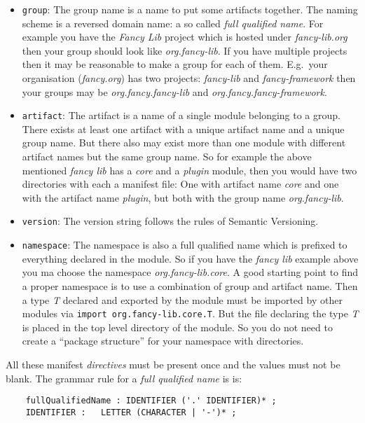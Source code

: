 \documentclass[a4paper,12pt]{report}
\begin{document}
\begin{itemize}
    \item \texttt{group}: The group name is a name to put some artifacts together. The naming scheme is a reversed domain name: a so called \textit{full qualified name}. For example you have the \textit{Fancy Lib} project which is hosted under \textit{fancy-lib.org} then your group should look like \textit{org.fancy-lib}. If you have multiple projects then it may be reasonable to make a group for each of them. E.g.\ your organisation (\textit{fancy.org}) has two projects: \textit{fancy-lib} and \textit{fancy-framework} then your groups may be \textit{org.fancy.fancy-lib} and \textit{org.fancy.fancy-framework}.
    \item \texttt{artifact}: The artifact is a name of a single module belonging to a group. There exists at least one artifact with a unique artifact name and a unique group name. But there also may exist more than one module with different artifact names but the same group name. So for example the above mentioned \textit{fancy lib} has a \textit{core} and a \textit{plugin} module, then you would have two directories with each a manifest file: One with artifact name \textit{core} and one with the artifact name \textit{plugin}, but both with the group name \textit{org.fancy-lib}.
    \item \texttt{version}: The version string follows the rules of Semantic Versioning\cite{semver}.
    \item \texttt{namespace}: The namespace is also a full qualified name which is prefixed to everything declared in the module. So if you have the \textit{fancy lib} example above you ma choose the namespace \textit{org.fancy-lib.core}. A good starting point to find a proper namespace is to use a combination of group and artifact name. Then a type \textit{T} declared and exported by the module must be imported by other modules via \texttt{import org.fancy-lib.core.T}. But the file declaring the type \textit{T} is placed in the top level directory of the module. So you do not need to create a ``package structure'' for your namespace with directories. 
\end{itemize}

All these manifest \textit{directives} must be present once and the values must not be blank. The grammar rule for a \textit{full qualified name} is is: 

\begin{verbatim}
    fullQualifiedName : IDENTIFIER ('.' IDENTIFIER)* ;    
    IDENTIFIER :   LETTER (CHARACTER | '-')* ;
\end{verbatim}
\end{document}
